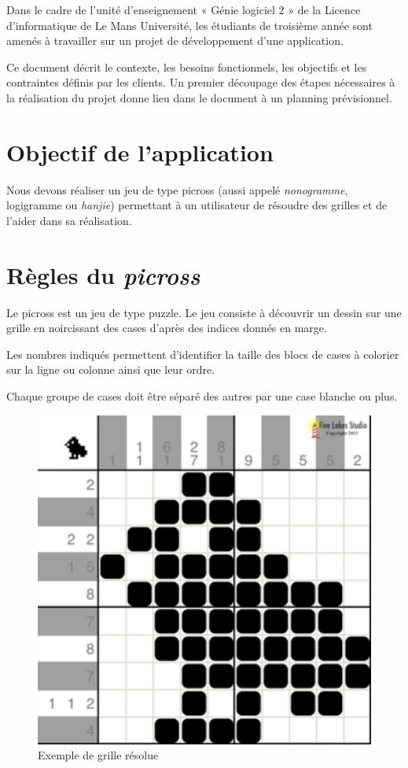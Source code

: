 \documentclass{report}
\begin{document}
		Dans le cadre de l'unité d'enseignement « Génie logiciel 2 » de la Licence d'informatique de Le Mans Université, les étudiants de troisième année sont amenés à travailler sur un projet de développement d'une application.
		
		Ce document décrit le contexte, les besoins fonctionnels, les objectifs et les contraintes définis par les clients. Un premier découpage des étapes nécessaires à la réalisation du projet donne lieu dans le document à un planning prévisionnel.

	
 	\section{Objectif de l'application}		
		Nous devons réaliser un jeu de type picross (aussi appelé \textit{nonogramme}, logigramme ou \textit{hanjie}) permettant à un utilisateur de résoudre des grilles et de l'aider dans sa réalisation.

	\section{Règles du \textit{picross}}
		Le picross est un jeu de type puzzle. Le jeu consiste à découvrir un dessin sur une grille en noircissant des cases d'après des indices donnés en marge.
		
		Les nombres indiqués permettent d'identifier la taille des blocs de cases à colorier sur la ligne ou colonne ainsi que leur ordre.

		Chaque groupe de cases doit être séparé des autres par une case blanche ou plus.
		
		\begin{figure}[H]
		\centering
		\caption{Exemple de grille résolue}
		\includegraphics[width=17cm]{picross.png}
	\end{figure}
	
\end{document}
